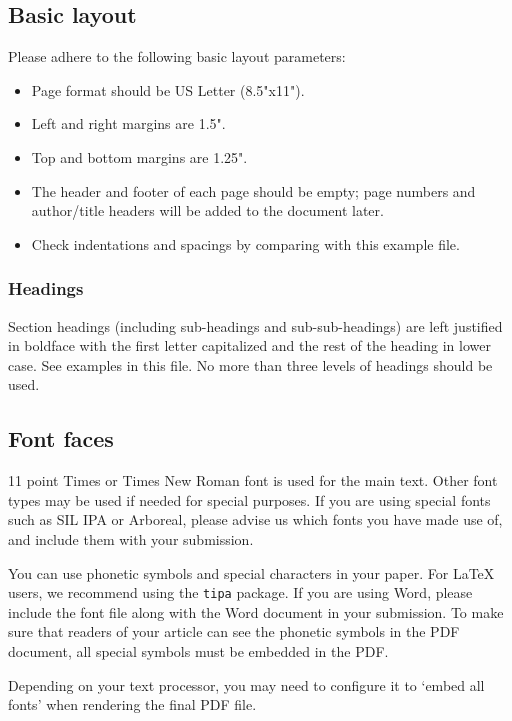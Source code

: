 \documentclass{tls}
\begin{document}
\subsection{Basic layout}

Please adhere to the following basic layout parameters:

\begin{itemize}
  \item Page format should be US Letter (8.5"x11").
  \item Left and right margins are 1.5".
  \item Top and bottom margins are 1.25".
  \item The header and footer of each page should be empty; page numbers and author/title headers will be added to the document later.
  \item Check indentations and spacings by comparing with this example file.
\end{itemize}

\subsubsection{Headings}

Section headings (including sub-headings and sub-sub-headings) are left justified in boldface with the first letter capitalized and the rest of the heading in lower case. See examples in this file. No more than three levels of headings should be used.

\subsection{Font faces}

11 point Times or Times New Roman font is used for the main text. Other font types may be used if needed for special purposes. If you are using special fonts such as SIL IPA or Arboreal, please advise us which fonts you have made use of, and include them with your submission.

You can use phonetic symbols and special characters in your paper. For \LaTeX{} users, we recommend using the \texttt{tipa} package. If you are using Word, please include the font file along with the Word document in your submission. To make sure that readers of your article can see the phonetic symbols in the PDF document, all special symbols must be embedded in the PDF.

Depending on your text processor, you may need to configure it to `embed all fonts' when rendering the final PDF file.
\end{document}
